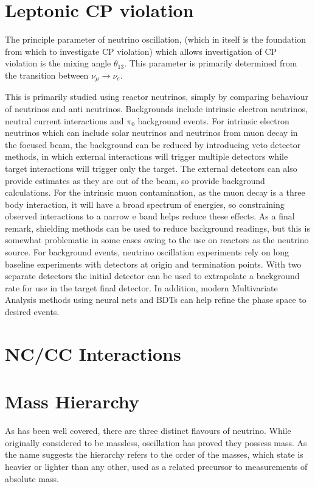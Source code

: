 \documentclass[]{article}
\begin{document}
	\section{Leptonic CP violation}
	
	The principle parameter of neutrino oscillation, (which in itself is the foundation from which to investigate CP violation) which allows investigation of CP violation is the mixing angle $\theta_{13}$. This parameter is primarily determined from the transition between $\nu_\mu\rightarrow\nu_e$.
	
	This is primarily studied using reactor neutrinos, simply by comparing behaviour of neutrinos and anti neutrinos. Backgrounds include intrinsic electron neutrinos, neutral current interactions and $\pi_0$ background events. For intrinsic electron neutrinos which can include solar neutrinos and neutrinos from muon decay in the focused beam, the background can be reduced by introducing veto detector methods, in which external interactions will trigger multiple detectors while target interactions will trigger only the target. The external detectors can also provide estimates as they are out of the beam, so provide background calculations. For the intrinsic muon contamination, as the muon decay is a three body interaction, it will have a broad spectrum of energies, so constraining observed interactions to a narrow e band helps reduce these effects. As a final remark, shielding methods can be used to reduce background readings, but this is somewhat problematic in some cases owing to the use on reactors as the neutrino source. For background events, neutrino oscillation experiments rely on long baseline experiments with detectors at origin and termination points. With two separate detectors the initial detector can be used to extrapolate a background rate for use in the target final detector. In addition, modern Multivariate Analysis methods using neural nets and BDTs can  help refine the phase space to desired events.
	
	\section{NC/CC Interactions}
	
	\newpage
	
	\section{Mass Hierarchy}
	
		As has been well covered, there are three distinct flavours of neutrino. While originally considered to be massless, oscillation has proved they possess mass. As the name suggests the hierarchy refers to the order of the masses, which state is heavier or lighter than any other, used as a related precursor to measurements of absolute mass.
		
\end{document}
